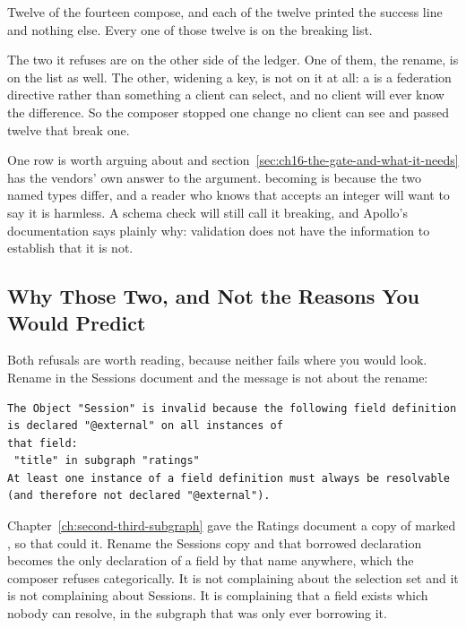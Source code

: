 %
Twelve of the fourteen compose, and each of the twelve printed the success
line and nothing else. Every one of those twelve is on the breaking list.

%
The two it refuses are on the other side of the ledger. One of them, the
rename, is on the list as well. The other, widening a key, is not on it at
all: a  is a federation directive rather than something a client
can select, and no client will ever know the difference. So the composer
stopped one change no client can see and passed twelve that break one.

%
One row is worth arguing about and
section~\ref{sec:ch16-the-gate-and-what-it-needs} has the vendors' own answer
to the argument.  becoming  is
 because the two named types differ, and a reader who
knows that  accepts an integer will want to say it is harmless. A
schema check will still call it breaking, and Apollo's documentation says
plainly why: validation does not have the information to establish that it is
not.

\subsection{Why Those Two, and Not the Reasons You Would Predict}

%
Both refusals are worth reading, because neither fails where you would look.
Rename  in the Sessions document and the message is not
about the rename:

\begin{verbatim}
The Object "Session" is invalid because the following field definition is declared "@external" on all instances of
that field:
 "title" in subgraph "ratings"
At least one instance of a field definition must always be resolvable (and therefore not declared "@external").
\end{verbatim}

%
Chapter~\ref{ch:second-third-subgraph} gave the Ratings document a copy of
 marked , so that  could
 it.
Rename the Sessions copy and that borrowed declaration becomes the only
declaration of a field by that name anywhere, which the composer refuses
categorically. It is not complaining about the  selection set
and it is not complaining about Sessions. It is complaining that a field
exists which nobody can resolve, in the subgraph that was only ever borrowing
it.

